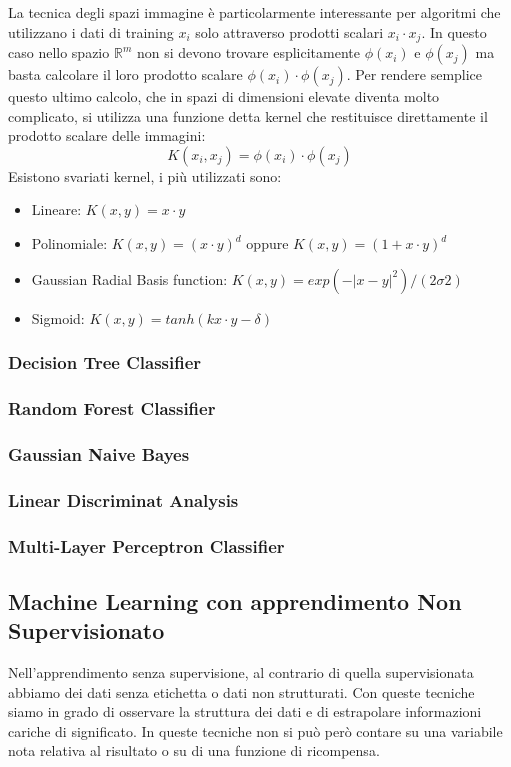 \documentclass[12pt,italian]{report}
\begin{document}
La tecnica degli spazi immagine è particolarmente interessante per algoritmi che utilizzano i dati di training $x_i$ solo attraverso prodotti scalari $x_i \cdot x_j$. In questo caso nello spazio $\mathbb{R}^{m}$ non si devono trovare esplicitamente $\phi(x_i)$ e $\phi (x_j)$ ma basta calcolare il loro prodotto scalare $\phi (x_i) \cdot \phi (x_j)$. Per rendere semplice questo ultimo calcolo, che in spazi di dimensioni elevate diventa molto complicato, si utilizza una funzione detta kernel che restituisce direttamente il prodotto scalare delle immagini:
\begin{equation}
K(x_i, x_j) = \phi (x_i) \cdot \phi (x_j)
\end{equation}
Esistono svariati kernel, i più utilizzati sono:
\begin{itemize}
	\item Lineare: $K(x, y) = x \cdot y$
	\item Polinomiale: $K(x, y) = (x \cdot y)^{d}$ oppure $K(x, y) = (1 + x \cdot y)^{d}$
	\item Gaussian Radial Basis function: $K(x,y) = exp (- \left | x-y \right |^2)/(2 \sigma 2)$
	\item Sigmoid: $K(x,y) = tanh(k x \cdot y - \delta)$ 
\end{itemize}

\subsubsection{Decision Tree Classifier}

\subsubsection{Random Forest Classifier}
\subsubsection{Gaussian Naive Bayes}
\subsubsection{Linear Discriminat Analysis}
\subsubsection{Multi-Layer Perceptron Classifier}
\subsection{Machine Learning con apprendimento Non Supervisionato}
Nell’apprendimento senza supervisione, al contrario di quella supervisionata abbiamo dei dati senza etichetta o dati non strutturati. Con queste tecniche siamo in grado di osservare la struttura dei dati e di estrapolare informazioni cariche di significato. In queste tecniche non si può però contare su una variabile nota relativa al risultato o su di una funzione di ricompensa.
\end{document}
